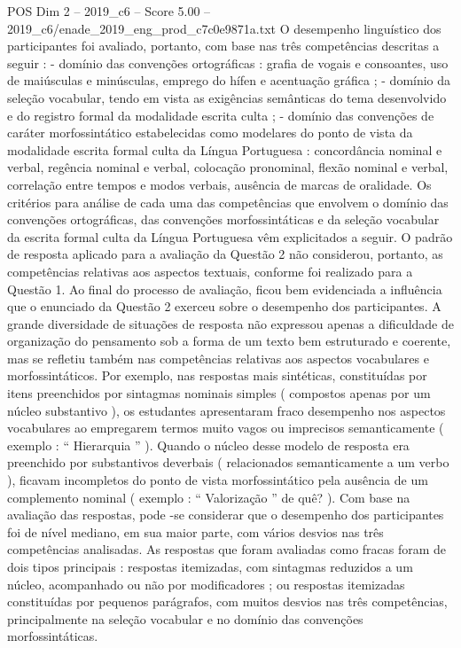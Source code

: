 \begin{textsample}{POS Dim 2 – 2019\_c6 – Score 5.00 – 2019\_c6/enade\_2019\_eng\_prod\_c7c0e9871a.txt}
O desempenho linguístico dos participantes foi avaliado, portanto, com base nas três competências descritas a seguir : - domínio das convenções ortográficas : grafia de vogais e consoantes, uso de maiúsculas e minúsculas, emprego do hífen e acentuação gráfica ; - domínio da seleção vocabular, tendo em vista as exigências semânticas do tema desenvolvido e do registro formal da modalidade escrita culta ; - domínio das convenções de caráter morfossintático estabelecidas como modelares do ponto de vista da modalidade escrita formal culta da Língua Portuguesa : concordância nominal e verbal, regência nominal e verbal, colocação pronominal, flexão nominal e verbal, correlação entre tempos e modos verbais, ausência de marcas de oralidade.
Os critérios para análise de cada uma das competências que envolvem o domínio das convenções ortográficas, das convenções morfossintáticas e da seleção vocabular da escrita formal culta da Língua Portuguesa vêm explicitados a seguir.
O padrão de resposta aplicado para a avaliação da Questão 2 não considerou, portanto, as competências relativas aos aspectos textuais, conforme foi realizado para a Questão 1.
Ao final do processo de avaliação, ficou bem evidenciada a influência que o enunciado da Questão 2 exerceu sobre o desempenho dos participantes.
A grande diversidade de situações de resposta não expressou apenas a dificuldade de organização do pensamento sob a forma de um texto bem estruturado e coerente, mas se refletiu também nas competências relativas aos aspectos vocabulares e morfossintáticos.
Por exemplo, nas respostas mais sintéticas, constituídas por itens preenchidos por sintagmas nominais simples ( compostos apenas por um núcleo substantivo ), os estudantes apresentaram fraco desempenho nos aspectos vocabulares ao empregarem termos muito vagos ou imprecisos semanticamente ( exemplo : “ Hierarquia ” ).
Quando o núcleo desse modelo de resposta era preenchido por substantivos deverbais ( relacionados semanticamente a um verbo ), ficavam incompletos do ponto de vista morfossintático pela ausência de um complemento nominal ( exemplo : “ Valorização ” de quê? ).
Com base na avaliação das respostas, pode -se considerar que o desempenho dos participantes foi de nível mediano, em sua maior parte, com vários desvios nas três competências analisadas.
As respostas que foram avaliadas como fracas foram de dois tipos principais : respostas itemizadas, com sintagmas reduzidos a um núcleo, acompanhado ou não por modificadores ; ou respostas itemizadas constituídas por pequenos parágrafos, com muitos desvios nas três competências, principalmente na seleção vocabular e no domínio das convenções morfossintáticas.

\end{textsample}
